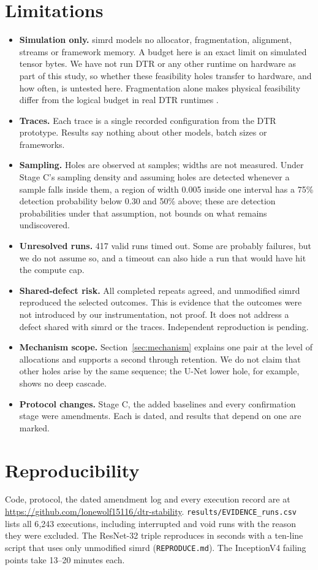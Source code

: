 \documentclass[11pt]{article}
\begin{document}
\section{Limitations}\label{sec:limits}
\begin{itemize}
\item \textbf{Simulation only.} simrd models no allocator, fragmentation, alignment,
streams or framework memory. A budget here is an exact limit on simulated tensor bytes. We
have not run DTR or any other runtime on hardware as part of this study, so whether these
feasibility holes transfer to hardware, and how often, is untested here. Fragmentation alone makes physical feasibility differ from the
logical budget in real DTR runtimes \cite{zhang2023coop,hu2022megtaichi}.
\item \textbf{Traces.} Each trace is a single recorded configuration from the DTR prototype.
Results say nothing about other models, batch sizes or frameworks.
\item \textbf{Sampling.} Holes are observed at samples; widths are not measured. Under
Stage C's sampling density and assuming holes are detected whenever a sample falls inside them,
a region of width 0.005 inside one interval has a 75\% detection probability below 0.30 and 50\%
above; these are detection probabilities under that assumption, not bounds on what remains
undiscovered.
\item \textbf{Unresolved runs.} 417 valid runs timed out. Some are probably failures, but we
do not assume so, and a timeout can also hide a run that would have hit the compute cap.
\item \textbf{Shared-defect risk.} All completed repeats agreed, and unmodified simrd
reproduced the selected outcomes. This is evidence that the outcomes were not introduced by
our instrumentation, not proof. It does not address a defect shared with simrd or the traces. Independent
reproduction is pending.
\item \textbf{Mechanism scope.} Section~\ref{sec:mechanism} explains one pair at the level
of allocations and supports a second through retention. We do not claim that other holes
arise by the same sequence; the U-Net lower hole, for example, shows no deep cascade.
\item \textbf{Protocol changes.} Stage C, the added baselines and every confirmation stage
were amendments. Each is dated, and results that depend on one are marked.
\end{itemize}

\section{Reproducibility}
Code, protocol, the dated amendment log and every execution record are at
\url{https://github.com/lonewolf15116/dtr-stability}. \texttt{results/EVIDENCE\_runs.csv}
lists all 6{,}243 executions, including interrupted and void runs with the reason they were
excluded. The ResNet-32 triple reproduces in seconds with a ten-line script that uses only
unmodified simrd (\texttt{REPRODUCE.md}). The InceptionV4 failing points take 13--20 minutes each.
\end{document}
